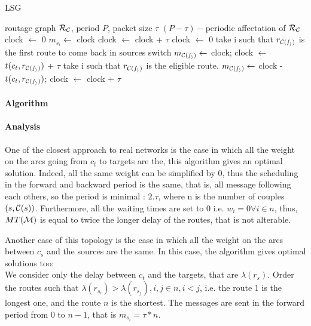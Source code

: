 \documentclass[a4paper,10pt]{article}
\begin{document}
\begin{algorithm}[H]
\caption{LSG}
\begin{algorithmic}
\REQUIRE routage graph ${\cal R_{\cal C}}$, period $P$, packet size $\tau$
\ENSURE $(P-\tau)-$periodic affectation of ${\cal R_{\cal C}}$
\STATE clock $\leftarrow$ 0
\STATE  $m_{s_i} \leftarrow$ clock
\STATE clock $\leftarrow$ clock + $\tau$
\ENDFOR
\STATE clock $\leftarrow$ 0
\STATE take i such that $r_{\cal C(s_i)}$ is the first route to come back in sources switch
\STATE $m_{\cal C(s_i)} \leftarrow $ clock;
\STATE clock $\leftarrow$ $t(c_t,r_{\cal C(s_i)})$ + $\tau$
\STATE take i such that $r_{\cal C(s_i)}$ is the eligible route.
\STATE $m_{\cal C(s_i)} \leftarrow $ clock - $t(c_t,r_{\cal C(s_i)})$;
\STATE clock $\leftarrow$ clock + $\tau$

\ENDWHILE

\end{algorithmic}
\end{algorithm}

	\paragraph{Algorithm}
	\paragraph{Analysis}
	
One of the closest approach to real networks is the case in which all the weight on the arcs going from $c_t$ to targets are the, this algorithm gives an optimal solution. Indeed, all the same weight can be simplified by 0, thus the scheduling in the forward and backward period is the same, that is, all message following each others, so the period is minimal : $2 .\tau$, where n is the number of couples $(s,{\cal C}(s))$. Furthermore, all the waiting times are set to 0 i.e. $w_i = 0 \forall i \in n$, thus, $MT({\cal M})$ is equal to twice the longer delay of the routes, that is not alterable.

Another case of this topology is the case in which all the weight on the arcs between $c_s$ and the sources are the same.
In this case, the algorithm gives optimal solutions too:\\

We consider only the delay between $c_t$ and the targets, that are $\lambda(r_{s})$. Order the routes such that $\lambda(r_{s_i}) > \lambda(r_{s_j}), i,j \in n, i<j$, i.e. the route 1 is the longest one, and the route $n$ is the shortest.
The messages are sent in the forward period from 0 to $n-1$, that is $m_{s_i} = \tau * n$.
\end{document}
